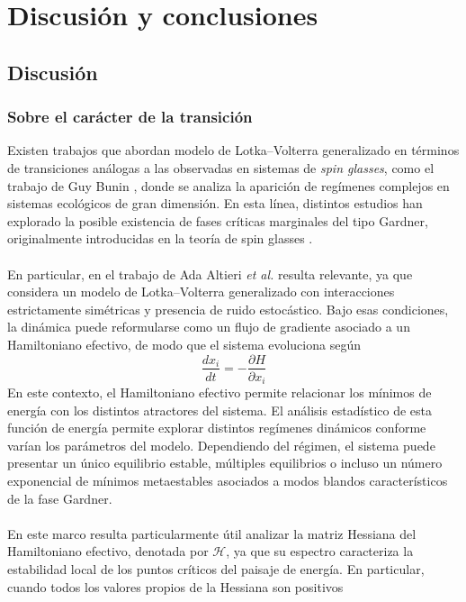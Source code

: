 \chapter{Discusión y conclusiones}

\section{Discusión}

\subsection{Sobre el carácter de la transición}

\setlength{\parindent}{0cm} Existen trabajos que abordan modelo de Lotka--Volterra generalizado en términos de transiciones análogas a las observadas en sistemas de \textit{spin glasses}, como el trabajo de Guy Bunin \cite{bunin2017ecological}, donde se analiza la aparición de regímenes complejos en sistemas ecológicos de gran dimensión. En esta línea, distintos estudios han explorado la posible existencia de fases críticas marginales del tipo Gardner, originalmente introducidas en la teoría de spin glasses \cite{biroli2018marginally,altieri2021properties}.
\\
\\
En particular, en el trabajo de Ada Altieri \textit{et al.} resulta relevante, ya que considera un modelo de Lotka--Volterra generalizado con interacciones estrictamente simétricas y presencia de ruido estocástico. Bajo esas condiciones, la dinámica puede reformularse como un flujo de gradiente asociado a un Hamiltoniano efectivo, de modo que el sistema evoluciona según
$$\frac{dx_i}{dt}=-\frac{\partial H}{\partial x_i}$$
En este contexto, el Hamiltoniano efectivo permite relacionar los mínimos de energía con los distintos atractores del sistema. El análisis estadístico de esta función de energía permite explorar distintos regímenes dinámicos conforme varían los parámetros del modelo. Dependiendo del régimen, el sistema puede presentar un único equilibrio estable, múltiples equilibrios o incluso un número exponencial de mínimos metaestables asociados a modos blandos característicos de la fase Gardner.
\\
\\
En este marco resulta particularmente útil analizar la matriz Hessiana del Hamiltoniano efectivo, denotada por $\mathcal{H}$, ya que su espectro caracteriza la estabilidad local de los puntos críticos del paisaje de energía. En particular, cuando todos los valores propios de la Hessiana son positivos
